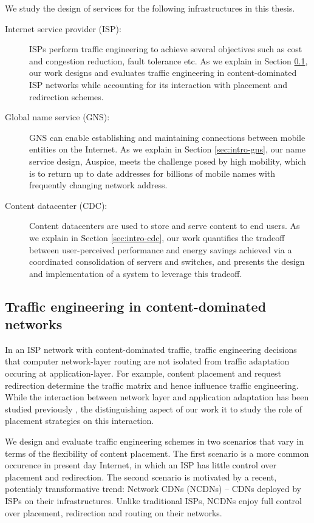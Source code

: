 We study the design of services for the following infrastructures in this thesis.

\begin{description}
	\item[Internet service provider (ISP):] ISPs perform traffic engineering to achieve several objectives such as cost and congestion reduction, fault tolerance etc. As we explain in Section \ref{sec:intro-te}, our work designs and evaluates traffic engineering in content-dominated ISP networks while accounting for its interaction with placement and redirection schemes. 
	\item[Global name service (GNS):] GNS can enable establishing and maintaining connections between mobile entities on the Internet. As we explain in Section \ref{sec:intro-gns}, our name service design, Auspice, meets the challenge posed by high mobility, which is to return up to date addresses for billions of mobile names with frequently changing network address.
	\item[Content datacenter (CDC):] Content datacenters are used to store and serve content to end users. As we explain in Section \ref{sec:intro-cdc}, our work quantifies the tradeoff between user-perceived performance and energy savings achieved via a coordinated consolidation of servers and switches, and presents the design and implementation of a system to leverage this tradeoff.
\end{description}

\subsection{Traffic engineering in content-dominated networks}
\label{sec:intro-te}
In an ISP network with content-dominated traffic, traffic engineering decisions that computer network-layer routing are not isolated from traffic adaptation occuring at application-layer. For example, content placement and request redirection determine the traffic matrix and hence influence traffic engineering. While the interaction between network layer and application adaptation has been studied previously \cite{Roughgarden,selfishQiu,Jiang2009,JohariGameTheory, CATE, P4P}, the distinguishing aspect of our work it to study the role of placement strategies on this interaction.

We design and evaluate traffic engineering schemes in two scenarios that vary in terms of the flexibility of content placement. The first scenario is a more common occurence in present day Internet, in which an ISP has little control over placement and redirection. The second scenario is motivated by a recent, potentialy transformative trend: Network CDNs (NCDNs) -- CDNs deployed by ISPs on their infrastructures. Unlike traditional ISPs, NCDNs enjoy full control over placement, redirection and routing on their networks.

